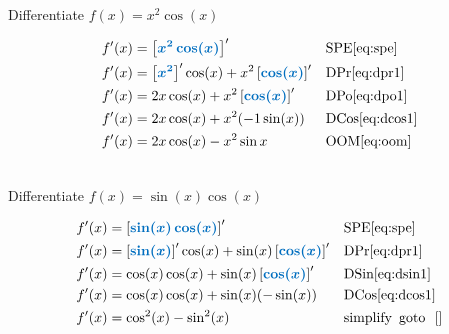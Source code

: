 \documentclass[20150903-160354-rs2.2-MarksMathNotebook.tex]{subfiles}
\begin{document}
\begin{example}[id:20141209-142321] \label{20141209-142321} \hfill \\

Differentiate $f(x)=x^2 \cos(x)$

\soln

\solnsteps
\begin{align*}
f'(x)&= \farg{x^2 \cos(x)}' && \text{SPE} \eqref{eq:spe} \\
f'(x)&= \farg{x^2}' \cos(x) + x^2 \farg{\cos (x)}' && \text{DPr} \eqref{eq:dpr1} \\
f'(x)&= 2x \cos (x) + x^2 \farg{\cos (x)}' && \text{DPo} \eqref{eq:dpo1} \\
f'(x)&= 2x \cos (x) + x^2 (-1 \sin(x)) && \text{DCos} \eqref{eq:dcos1} \\
f'(x)&= 2x \cos (x) - x^2 \sin x && \text{OOM} \eqref{eq:oom}
\end{align*}
\end{example}



\begin{example}[id:20150910-115935] \label{20150910-115935} \hfill \\

Differentiate $f(x)=\sin(x)\cos(x)$

\soln

\solnsteps
\begin{align*}
f'(x) & = \farg{\sin(x)\cos(x)}' && \text{SPE} \eqref{eq:spe} \\
f'(x) & = \farg{\sin(x)}'\cos(x)+ \sin(x)\farg{\cos(x)}' && \text{DPr} \eqref{eq:dpr1} \\
f'(x) & = \cos (x) \cos (x) + \sin(x)\farg{\cos(x)}' && \text{DSin} \eqref{eq:dsin1} \\
f'(x) &= \cos (x) \cos (x) + \sin(x) (-\sin(x)) && \text{DCos} \eqref{eq:dcos1} \\
f'(x) &= \cos^2(x)-\sin^2(x) && \text{simplify} \text{\, goto \,} \, \ref{} %
\end{align*}

\end{example}
\end{document}
